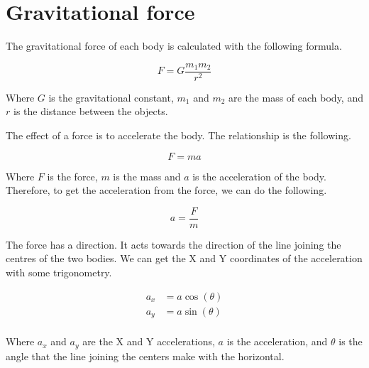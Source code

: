 \documentclass{amsart}
\begin{document}
\section{Gravitational force}

The gravitational force of each body is calculated with the following formula.

\begin{displaymath}
  F = G \frac{m_1m_2}{r^2}
\end{displaymath}

Where $G$ is the gravitational constant, $m_1$ and $m_2$ are the mass of each
body, and $r$ is the distance between the objects.

The effect of a force is to accelerate the body. The relationship is the
following.

\begin{displaymath}
  F = m a
\end{displaymath}

Where $F$ is the force, $m$ is the mass and $a$ is the acceleration of the
body. Therefore, to get the acceleration from the force, we can do the
following.

\begin{displaymath}
  a = \frac{F}{m}
\end{displaymath}

The force has a direction. It acts towards the direction of the line joining
the centres of the two bodies. We can get the X and Y coordinates of the
acceleration with some trigonometry.

\begin{align*}
  a_x &= a \cos(\theta) \\
  a_y &= a \sin(\theta) \\
\end{align*}

Where $a_x$ and $a_y$ are the X and Y accelerations, $a$ is the acceleration,
and $\theta$ is the angle that the line joining the centers make with the
horizontal.

\end{document}
